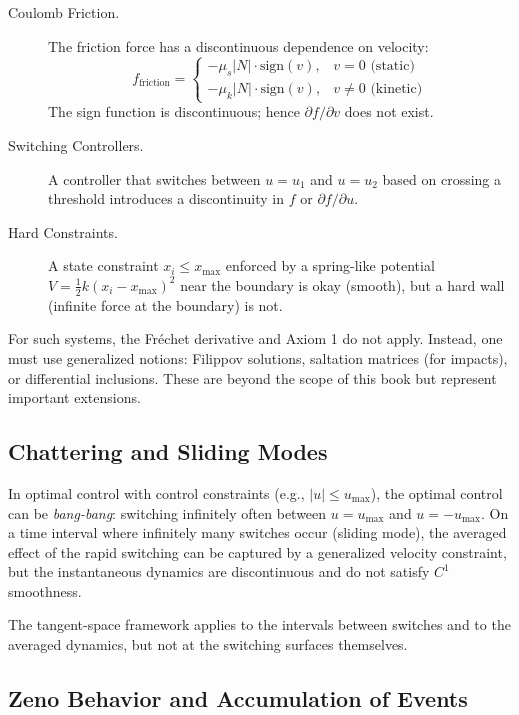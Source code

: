\begin{description}
\item[Coulomb Friction.] The friction force has a discontinuous dependence on velocity:
\begin{equation}
f_{\text{friction}} = \begin{cases}
-\mu_s |N| \cdot \text{sign}(v), & v = 0 \text{ (static)} \\
-\mu_k |N| \cdot \text{sign}(v), & v \neq 0 \text{ (kinetic)}
\end{cases}
\end{equation}
The sign function is discontinuous; hence $\partial f / \partial v$ does not exist.

\item[Switching Controllers.] A controller that switches between $u = u_1$ and $u = u_2$
based on crossing a threshold introduces a discontinuity in $f$ or $\partial f / \partial u$.

\item[Hard Constraints.] A state constraint $x_i \leq x_{\max}$ enforced by a spring-like
potential $V = \frac{1}{2}k(x_i - x_{\max})^2$ near the boundary is okay (smooth), but a
hard wall (infinite force at the boundary) is not.
\end{description}

For such systems, the Fréchet derivative and Axiom 1 do not apply. Instead, one must use
generalized notions: Filippov solutions, saltation matrices (for impacts), or differential
inclusions. These are beyond the scope of this book but represent important extensions.

\subsection{Chattering and Sliding Modes}

In optimal control with control constraints (e.g., $|u| \leq u_{\max}$), the optimal control
can be \emph{bang-bang}: switching infinitely often between $u = u_{\max}$ and $u = -u_{\max}$.
On a time interval where infinitely many switches occur (sliding mode), the averaged effect
of the rapid switching can be captured by a generalized velocity constraint, but the instantaneous
dynamics are discontinuous and do not satisfy $C^1$ smoothness.

The tangent-space framework applies to the intervals between switches and to the averaged dynamics,
but not at the switching surfaces themselves.

\subsection{Zeno Behavior and Accumulation of Events}

